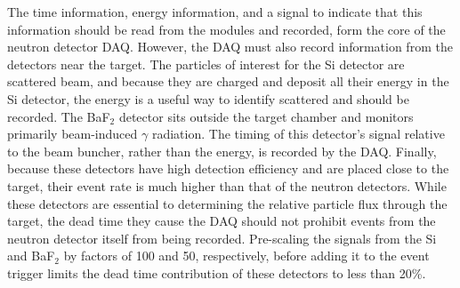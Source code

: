 The time information, energy information, and a signal to indicate that this information should be read from the modules and recorded, form the core of the neutron detector DAQ.  However, the DAQ must also record information from the detectors near the target.  The particles of interest for the Si detector are scattered  beam, and because they are charged and deposit all their energy in the Si detector, the energy is a useful way to identify scattered  and should be recorded.  The BaF$_2$ detector sits outside the target chamber and monitors primarily beam-induced $\gamma$ radiation.  The timing of this detector's signal relative to the beam buncher, rather than the energy, is recorded by the DAQ.  Finally, because these detectors have high detection efficiency and are placed close to the target, their event rate is much higher than that of the neutron detectors.  While these detectors are essential to determining the relative particle flux through the target, the dead time they cause the DAQ should not prohibit events from the neutron detector itself from being recorded.  Pre-scaling the signals from the Si and BaF$_2$ by factors of 100 and 50, respectively, before adding it to the event trigger limits the dead time contribution of these detectors to less than 20\%.
